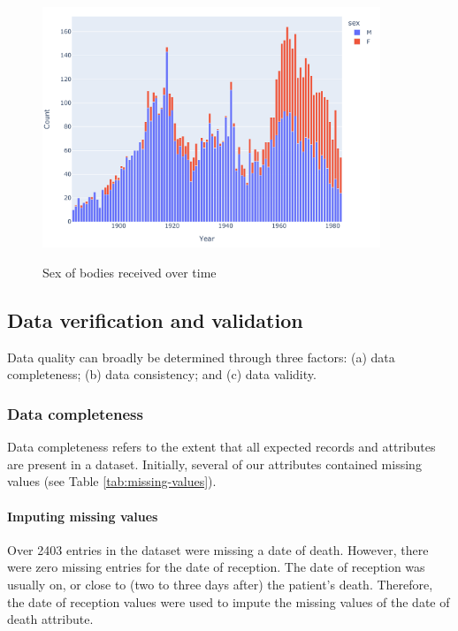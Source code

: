 \begin{figure}[p]
    \centering
    \caption{Sex of bodies received over time}
    \includegraphics[width=0.9\textwidth]{REPORT/img/data_by_sex.pdf}
    \label{fig:ida-by-sex}
\end{figure}

\subsection{Data verification and validation}\label{subsec:data-v-v}

Data quality can broadly be determined through three factors: (a) data completeness; (b) data consistency; and (c) data validity. 

\subsubsection{Data completeness}

Data completeness refers to the extent that all expected records and attributes are present in a dataset. Initially, several of our attributes contained missing values (see Table \ref{tab:missing-values}). 


\paragraph{Imputing missing values} Over 2403 entries in the dataset were missing a date of death. However, there were zero missing entries for the date of reception. The date of reception was usually on, or close to (two to three days after) the patient's death. Therefore, the date of reception values were used to impute the missing values of the date of death attribute.

